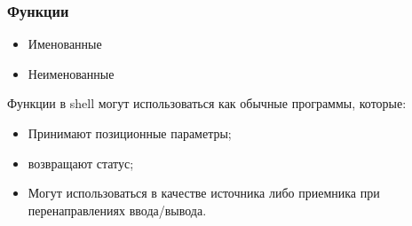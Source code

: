 \begin{frame}
	\frametitle{Функции}

	\begin{itemize}
		\item Именованные
		\item Неименованные
	\end{itemize}

	Функции в shell могут использоваться как обычные программы, которые:
	\begin{itemize}
		\item Принимают позиционные параметры;
		\item возвращают статус;
		\item Могут использоваться в качестве источника либо приемника 
			при перенаправлениях ввода/вывода.
	\end{itemize}

\end{frame}
